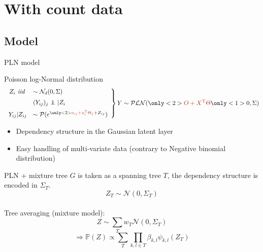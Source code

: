 \documentclass[9pt]{beamer}
\newcommand{\emphase}[1]{\textcolor{Complement}{#1}}
\newcommand\independent{\protect\mathpalette{\protect\independenT}{\perp}}\def\independenT#1#2{\mathrel{\rlap{$#1#2$}\mkern2mu{#1#2}}}
\begin{document}
\section{With count data}
\subsection{Model}


\begin{frame}{PLN model}
\begin{block}{Poisson log-Normal distribution \cite{AiH89}}
\[
            \left.
                \begin{array}{rl}
               \vspace{0.2cm}    Z_i \textit{ iid } &\sim \mathcal{N}_{d}(0,\Sigma)\\
              \vspace{0.2cm}    &(Y_{ij})_j \independent |Z_i\\
                    Y_{ij}|Z_{ij} &\sim \mathcal{P}(e^{\only<2>{\emphase{o_{ij}+x_i^{\text{T}}\Theta_j} +}Z_{ij}}) 
                   
                \end{array}
            \right \} Y \sim \mathcal{PLN}(\only<2>{\emphase{O+X^{\text{T}}\Theta }}\only<1>{0}, \Sigma)  
            \]
\end{block}

\begin{itemize}
    \item Dependency structure in the Gaussian latent layer
    \item Easy handling of multi-variate data (contrary to Negative binomial distribution)
\end{itemize}

\end{frame}

\begin{frame}{PLN + mixture tree}
    $G$ is taken as a spanning tree $T$, the dependency structure is encoded in $\Sigma_T$.
    \[Z_T \sim \mathcal{N}(0,\Sigma_T) \]
    \\ \bigskip
    Tree averaging (mixture model):
    \[Z \sim \sum_T w_T \mathcal{N}(0,\Sigma_T)\]
    $$\Rightarrow \mathds{P}(Z) \propto \sum_T \prod_{k,l \in T} \beta_{k,l} \psi_{k,l}(Z_T)$$ 
\end{frame}
\end{document}
